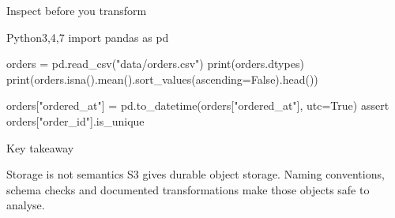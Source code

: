 \documentclass[../m00-session-02.tex]{subfiles}
\begin{document}

\begin{frame}[fragile]{Inspect before you transform}
  \begin{HighlightedCodeBlock}[numbers=left]{Python}{3,4,7}
import pandas as pd

orders = pd.read_csv("data/orders.csv")
print(orders.dtypes)
print(orders.isna().mean().sort_values(ascending=False).head())

orders["ordered_at"] = pd.to_datetime(orders["ordered_at"], utc=True)
assert orders["order_id"].is_unique
  \end{HighlightedCodeBlock}
\end{frame}

\begin{frame}{Key takeaway}
  \begin{TakeawayBox}{Storage is not semantics}
    S3 gives durable object storage. Naming conventions, schema checks and documented transformations make those objects safe to analyse.
  \end{TakeawayBox}
\end{frame}
\end{document}
